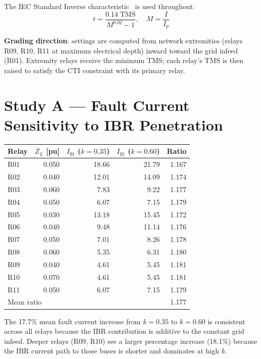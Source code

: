 \documentclass[11pt,a4paper]{article}
\begin{document}
\medskip\noindent
The IEC Standard Inverse characteristic~\cite{IEEE_C37_112} is used throughout:
\begin{equation}
  t = \frac{0.14\;\mathrm{TMS}}{M^{0.02} - 1},
  \quad M = \frac{I}{I_p}
  \label{eq:iec_inv}
\end{equation}

\noindent
\textbf{Grading direction}: settings are computed from network extremities
(relays R09, R10, R11 at maximum electrical depth) inward toward the grid
infeed (R01).  Extremity relays receive the minimum TMS; each relay's TMS
is then raised to satisfy the CTI constraint with its primary relay.

\section{Study A --- Fault Current Sensitivity to IBR Penetration}
\label{sec:studyA}

\begin{center}
\begin{tabular}{@{}lrrrr@{}}
\toprule
Relay & $Z_L$ [pu] & $I_\mathrm{flt}$ ($k=0.35$) & $I_\mathrm{flt}$ ($k=0.60$) & Ratio \\
\midrule
R01 & 0.050 & 18.66 & 21.79 & 1.167 \\
R02 & 0.040 & 12.01 & 14.09 & 1.174 \\
R03 & 0.060 & 7.83  & 9.22  & 1.177 \\
R04 & 0.050 & 6.07  & 7.15  & 1.179 \\
R05 & 0.030 & 13.18 & 15.45 & 1.172 \\
R06 & 0.040 & 9.48  & 11.14 & 1.176 \\
R07 & 0.050 & 7.01  & 8.26  & 1.178 \\
R08 & 0.060 & 5.35  & 6.31  & 1.180 \\
R09 & 0.040 & 4.61  & 5.45  & 1.181 \\
R10 & 0.070 & 4.61  & 5.45  & 1.181 \\
R11 & 0.050 & 6.07  & 7.15  & 1.179 \\
\midrule
\multicolumn{4}{l}{Mean ratio} & 1.177 \\
\bottomrule
\end{tabular}
\end{center}

\medskip\noindent
The 17.7\% mean fault current increase from $k=0.35$ to $k=0.60$ is
consistent across all relays because the IBR contribution is additive
to the constant grid infeed.  Deeper relays (R09, R10) see a larger
percentage increase (18.1\%) because the IBR current path to those buses
is shorter and dominates at high $k$.
\end{document}
